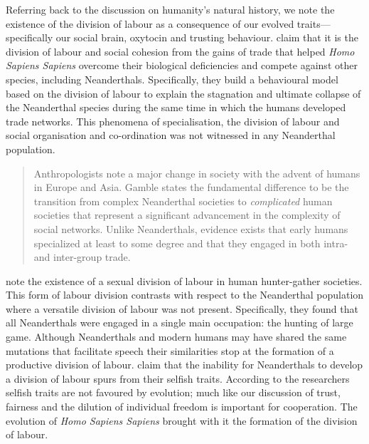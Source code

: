 Referring back to the discussion on humanity's natural history, we note the existence of the division of labour as a consequence of our evolved traits---specifically our social brain, oxytocin and trusting behaviour. \citet{Horan2005} claim that it is the division of labour and social cohesion from the gains of trade that helped \emph{Homo Sapiens Sapiens} overcome their biological deficiencies and compete against other species, including Neanderthals. Specifically, they build a behavioural model based on the division of labour to explain the stagnation and ultimate collapse of the Neanderthal species during the same time in which the humans developed trade networks. This phenomena of specialisation, the division of labour and social organisation and co-ordination was not witnessed in any Neanderthal population.

\begin{quote}
Anthropologists note a major change in society with the advent of humans in Europe and Asia. Gamble states the fundamental difference to be the transition from complex Neanderthal societies to \emph{complicated} human societies that represent a significant advancement in the complexity of social networks. Unlike Neanderthals, evidence exists that early humans specialized at least to some degree and that they engaged in both intra- and inter-group trade.

\begin{flushright}
\citet[p.~5]{Horan2005}
\end{flushright}
\end{quote}

\citet{KuhnSteiner2006} note the existence of a sexual division of labour in human hunter-gather societies. This form of labour division contrasts with respect to the Neanderthal population where a versatile division of labour was not present. Specifically, they found that all Neanderthals were engaged in a single main occupation: the hunting of large game. Although Neanderthals and modern humans may have shared the same mutations that facilitate speech their similarities stop at the formation of a productive division of labour. \citet{AdamiHintze2013} claim that the inability for Neanderthals to develop a division of labour spurs from their selfish traits. According to the researchers selfish traits are not favoured by evolution; much like our discussion of trust, fairness and the dilution of individual freedom is important for cooperation. The evolution of \emph{Homo Sapiens Sapiens} brought with it the formation of the division of labour.

